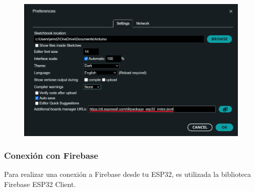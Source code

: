 \documentclass[../main]{subfiles}
\begin{document}
\begin{figure}[H]
	\centering
	\includegraphics[width = 13cm]{res/configuracionParaEsp32.png}
\end{figure}

\subsubsection{Conexión con Firebase}

Para realizar una conexión a Firebase desde tu ESP32, es utilizada la biblioteca
Firebase ESP32 Client.
\end{document}
